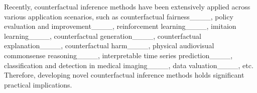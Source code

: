 Recently, counterfactual inference methods have been extensively applied across various application scenarios,
   such as counterfactual fairness____, policy evaluation and improvement____, reinforcement learning____, imitaion learning____, counterfactual generation____, counterfactual explanation____, counterfactual harm____, physical audiovisual commonsense reasoning____, interpretable time series prediction____,  classification and detection in medical imaging____, data valuation____, etc. 
   Therefore, developing novel counterfactual inference methods holds significant practical implications. 

